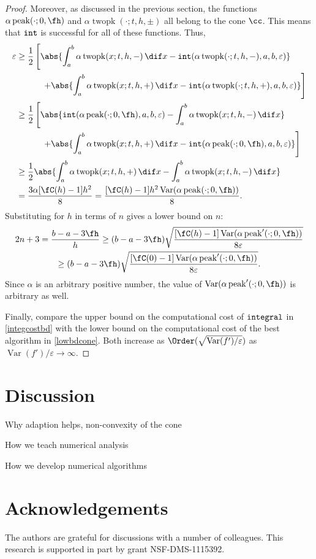 \documentclass[]{article}
\DeclareMathOperator{\integ}{\texttt{\textup{integral}}}
\DeclareMathOperator{\goodinteg}{\texttt{\textup{int}}}
\DeclareMathOperator{\Var}{Var}
\theoremstyle{definition}
\theoremstyle{remark}
\DeclareMathOperator{\tri}{peak}
\DeclareMathOperator{\twopk}{twopk}
\newcommand{\hcut}{\fh}
\begin{document}
\begin{proof}
Moreover, as discussed in the previous section, the functions $\alpha \tri(\cdot;0,\hcut)$ and $\alpha\twopk(\cdot;t,h,\pm)$ all belong to the cone $\cc$.  This means that $\goodinteg$ is successful for all of these functions. Thus,
\begin{align*}
\varepsilon & \ge \frac{1}{2}\left [ \abs{\int_a^b \alpha \twopk(x;t,h,-) \, \dif x - \goodinteg(\alpha \twopk(\cdot;t,h,-),a,b,\varepsilon)} \right . \\
& \quad \qquad \left . + \abs{\int_a^b \alpha \twopk(x;t,h,+) \, \dif x - \goodinteg(\alpha \twopk(\cdot;t,h,+),a,b,\varepsilon)} \right]  \\
& \ge \frac{1}{2}\left [ \abs{ \goodinteg(\alpha \tri(\cdot;0,\hcut),a,b,\varepsilon) -  \int_a^b \alpha \twopk(x;t,h,-) \, \dif x} \right . \\
& \quad \qquad \left . + \abs{ \int_a^b \alpha \twopk(x;t,h,+) \, \dif x - \goodinteg(\alpha \tri(\cdot;0,\hcut),a,b,\varepsilon) } \right]  \\
& \ge \frac{1}{2} \abs{  \int_a^b \alpha \twopk(x;t,h,+) \, \dif x -  \int_a^b \alpha \twopk(x;t,h,-) \, \dif x}  \\
& = \frac{3\alpha [\fC(h)-1]h^2}{8} = \frac{[\fC(h)-1]h^2 \Var(\alpha \tri(\cdot;0,\hcut))}{8}.
\end{align*}
Substituting for $h$ in terms of $n$ gives a lower bound on $n$:
\begin{multline*}
2n+3 = \frac{b-a-3\hcut}{h}
 \ge (b-a-3\hcut)\sqrt{\frac{[\fC(h)-1]\Var(\alpha \tri'(\cdot;0,\hcut))}{8\varepsilon}} \\
 \ge (b-a-3\hcut)\sqrt{\frac{[\fC(0)-1]\Var(\alpha \tri'(\cdot;0,\hcut))}{8\varepsilon}}.
\end{multline*}
Since $\alpha$ is an arbitrary positive number, the value of $\Var(\alpha \tri'(\cdot;0,\hcut))$ is arbitrary as well.

Finally, compare the upper bound on the computational cost of $\integ$ in \eqref{integcostbd} with the lower bound on the computational cost of the best algorithm in \eqref{lowbdcone}.  Both increase as $\Order(\sqrt{\Var(f')/\varepsilon})$ as $\Var(f')/\varepsilon \to \infty$.
\end{proof}






\section{Discussion} \label{discusssec}

Why adaption helps, non-convexity of the cone

How we teach numerical analysis

How we develop numerical algorithms

\section{Acknowledgements}  The authors are grateful for discussions with a number of colleagues. This research is supported in part by grant NSF-DMS-1115392.


\end{document}
